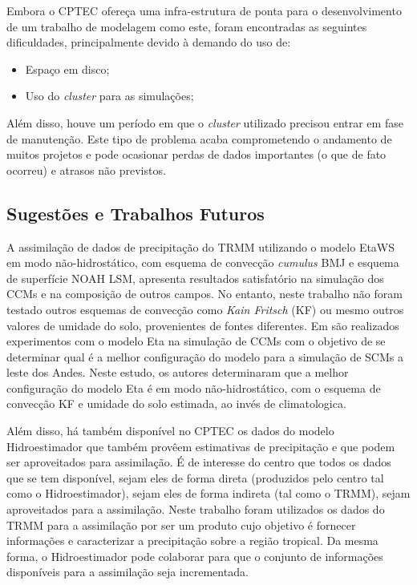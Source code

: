 Embora o CPTEC ofereça uma infra-estrutura de ponta para o desenvolvimento de um trabalho de modelagem como este, foram encontradas as seguintes dificuldades, principalmente devido à demando do uso de:

\begin{itemize}
\item Espaço em disco;
\item Uso do \textit{cluster} para as simulações;
\end{itemize}

Além disso, houve um período em que o \textit{cluster} utilizado precisou entrar em fase de manutenção. Este tipo de problema acaba comprometendo o andamento de muitos projetos e pode ocasionar perdas de dados importantes (o que de fato ocorreu) e atrasos não previstos.

\subsection{Sugestões e Trabalhos Futuros}

A assimilação de dados de precipitação do TRMM utilizando o modelo EtaWS em modo não-hidrostático, com esquema de convecção \textit{cumulus} BMJ e esquema de superfície NOAH LSM, apresenta resultados satisfatório na simulação dos CCMs e na composição de outros campos. No entanto, neste trabalho não foram testado outros esquemas de convecção como \textit{Kain Fritsch} (KF) ou mesmo outros valores de umidade do solo, provenientes de fontes diferentes. Em  são realizados experimentos com o modelo Eta na simulação de CCMs com o objetivo de se determinar qual é a melhor configuração do modelo para a simulação de SCMs a leste dos Andes. Neste estudo, os autores determinaram que a melhor configuração do modelo Eta é em modo não-hidrostático, com o esquema de convecção KF e umidade do solo estimada, ao invés de climatologica.

Além disso, há também disponível no CPTEC os dados do modelo Hidroestimador que também provêem estimativas de precipitação e que podem ser aproveitados para assimilação. É de interesse do centro que todos os dados que se tem disponível, sejam eles de forma direta (produzidos pelo centro tal como o Hidroestimador), sejam eles de forma indireta (tal como o TRMM), sejam aproveitados para a assimilação. Neste trabalho foram utilizados os dados do TRMM para a assimilação por ser um produto cujo objetivo é fornecer informações e caracterizar a precipitação sobre a região tropical. Da mesma forma, o Hidroestimador pode colaborar para que o conjunto de informações disponíveis para a assimilação seja incrementada.

